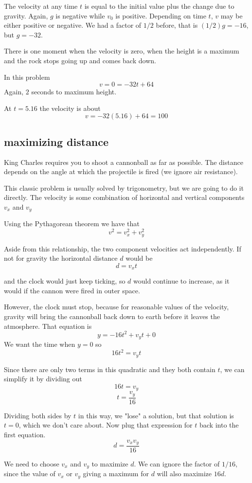 \documentclass[11pt, oneside]{article}
\begin{document}
The velocity at any time $t$ is equal to the initial value plus the change due to gravity.  Again, $g$ is negative while $v_0$ is positive.  Depending on time $t$, $v$ may be either positive or negative.  We had a factor of $1/2$ before, that is $(1/2)g = -16$, but $g = -32$.

There is one moment when the velocity is zero, when the height is a maximum and the rock stops going up and comes back down.

In this problem
\[ v = 0 = -32t + 64 \]
Again, $2$ seconds to maximum height.

At $t = 5.16$ the velocity is about
\[ v = -32 (5.16) + 64 = 100 \]

\subsection*{maximizing distance}
King Charles requires you to shoot a cannonball as far as possible.  The distance depends on the angle at which the projectile is fired (we ignore air resistance).  

This classic problem is usually solved by trigonometry, but we are going to do it directly.  The velocity is some combination of horizontal and vertical components $v_x$ and $v_y$

Using the Pythagorean theorem we have that
\[ v^2 = v_x^2 + v_y^2 \]

Aside from this relationship, the two component velocities act independently.  If not for gravity the horizontal distance $d$ would be 
\[ d = v_x t \]

and the clock would just keep ticking, so $d$ would continue to increase, as it would if the cannon were fired in outer space.

However, the clock must stop, because for reasonable values of the velocity, gravity will bring the cannonball back down to earth before it leaves the atmosphere.  That equation is
\[ y = -16t^2 + v_y t + 0 \]
We want the time when $y = 0$ so
\[ 16t^2 = v_y t \]

Since there are only two terms in this quadratic and they both contain $t$, we can simplify it by dividing out
\[ 16t = v_y \]
\[ t = \frac{v_y}{16} \]

Dividing both sides by $t$ in this way, we "lose" a solution, but that solution is $t = 0$, which we don't care about.  Now plug that expression for $t$ back into the first equation.
\[ d = \frac{v_x v_y}{16} \]

We need to choose $v_x$ and $v_y$ to maximize $d$.  We can ignore the factor of $1/16$, since the value of $v_x$ or $v_y$ giving a maximum for $d$ will also maximize $16d$.
\end{document}
